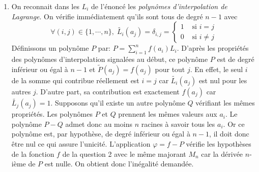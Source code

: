 \begin{enumerate}
\item On reconnait dans les $L_i$ de l'énoncé les \emph{polynômes d'interpolation de Lagrange}. On vérifie immédiatement qu'ils sont tous de degré $n-1$ avec
\begin{displaymath}
 \forall (i,j)\in \{1,\cdots,n\},\;
\widetilde{L_i}(a_j)=\delta_{i,j}
=
\left\lbrace 
\begin{aligned}
 1 &\text{ si } i=j \\ 0 &\text{ si } i\neq j 
\end{aligned}
\right. 
\end{displaymath}
Définissons un polynôme $P$ par: $P = \sum_{i=1}^{n}f(a_i)L_i$.\newline
D'après les propriétés des polynômes d'interpolation signalées au début, ce polynôme $P$ est de degré inférieur ou égal à $n-1$ et $\widetilde{P}(a_j)=f(a_j)$ pour tout $j$. En effet, le seul $i$ de la somme qui contribue réellement est $i=j$ car $\widetilde{L_i}(a_j)$ est nul pour les autres $j$. D'autre part, sa contribution est exactement $f(a_j)$ car $\widetilde{L_j}(a_j)=1$.\newline
Supposons qu'il existe un autre polynôme $Q$ vérifiant les mêmes propriétés.\newline
Les polynômes $P$ et $Q$ prennent les mêmes valeurs aux $a_i$. Le polynôme $P-Q$ admet donc au moins $n$ racines à savoir tous les $a_i$. Or ce polynôme est, par hypothèse, de degré inférieur ou égal à $n-1$, il doit donc être nul ce qui assure l'unicité.\newline
L'application $\varphi = f-P$ vérifie les hypothèses de la fonction $f$ de la question 2 avec le même majorant $M_n$ car la dérivée $n$-ième de $P$ est nulle. On obtient donc l'inégalité demandée. 
\end{enumerate}
